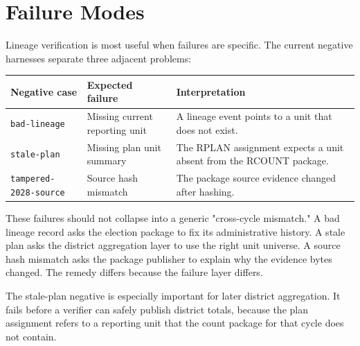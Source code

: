 \section{Failure Modes}

Lineage verification is most useful when failures are specific. The current
negative harnesses separate three adjacent problems:

\begin{center}
\small
\begin{tabularx}{\textwidth}{lXX}
\toprule
Negative case & Expected failure & Interpretation \\
\midrule
\texttt{bad-lineage} & Missing current reporting unit & A lineage event points to a unit that does not exist. \\
\texttt{stale-plan} & Missing plan unit summary & The RPLAN assignment expects a unit absent from the RCOUNT package. \\
\texttt{tampered-2028-source} & Source hash mismatch & The package source evidence changed after hashing. \\
\bottomrule
\end{tabularx}
\end{center}

These failures should not collapse into a generic "cross-cycle mismatch." A bad
lineage record asks the election package to fix its administrative history. A
stale plan asks the district aggregation layer to use the right unit universe.
A source hash mismatch asks the package publisher to explain why the evidence
bytes changed. The remedy differs because the failure layer differs.

The stale-plan negative is especially important for later district aggregation.
It fails before a verifier can safely publish district totals, because the plan
assignment refers to a reporting unit that the count package for that cycle does
not contain.
